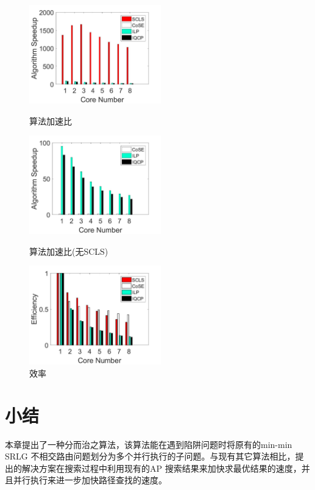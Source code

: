 \begin{figure}[htb]
\centering
\begin{minipage}[t]{0.3\linewidth}
\centering
\includegraphics[width=2.25in]{figures/Multiple}
\caption{算法加速比}
\label{fig:Multiple}
\end{minipage}
\hfill
\begin{minipage}[t]{0.3\linewidth}
\centering
\includegraphics[width=2.25in]{figures/MultipleNoSCLS}
\caption{算法加速比(无SCLS)}
\label{fig:MultipleNoSCLS}
\end{minipage}
\hfill
\begin{minipage}[t]{0.3\linewidth}
\centering
\includegraphics[width=2.25in]{figures/Efficiency}
 \caption{效率}
 \label{fig:Efficiency}
\end{minipage}
\end{figure}
\section{小结}
本章提出了一种分而治之算法，该算法能在遇到陷阱问题时将原有的min-min SRLG 不相交路由问题划分为多个并行执行的子问题。与现有其它算法相比，提出的解决方案在搜索过程中利用现有的AP 搜索结果来加快求最优结果的速度，并且并行执行来进一步加快路径查找的速度。


